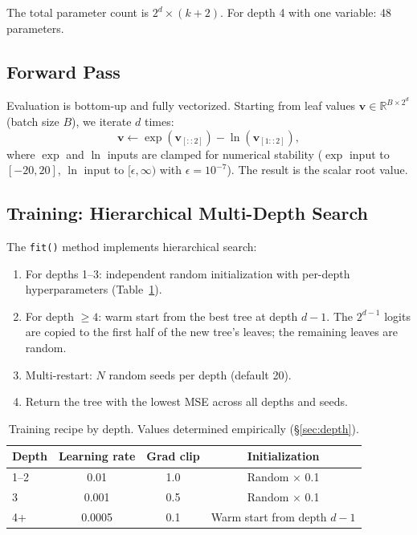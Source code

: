 \documentclass[11pt,a4paper]{article}
\begin{document}
The total parameter count is $2^d \times (k+2)$.
For depth 4 with one variable: 48 parameters.



\subsection{Forward Pass}

Evaluation is bottom-up and fully vectorized.
Starting from leaf values $\mathbf{v} \in \mathbb{R}^{B \times 2^d}$ (batch size $B$), we iterate $d$ times:
\begin{equation}
    \mathbf{v} \leftarrow \exp(\mathbf{v}_{[::2]}) - \ln(\mathbf{v}_{[1::2]}),
\end{equation}
where $\exp$ and $\ln$ inputs are clamped for numerical stability ($\exp$ input to $[-20, 20]$, $\ln$ input to $[\epsilon, \infty)$ with $\epsilon = 10^{-7}$).
The result is the scalar root value.

\subsection{Training: Hierarchical Multi-Depth Search}
\label{sec:training}

The \texttt{fit()} method implements hierarchical search:

\begin{enumerate}
    \item For depths 1--3: independent random initialization with per-depth hyperparameters (Table~\ref{tab:recipe}).
    \item For depth $\geq 4$: warm start from the best tree at depth $d-1$. The $2^{d-1}$ logits are copied to the first half of the new tree's leaves; the remaining leaves are random.
    \item Multi-restart: $N$ random seeds per depth (default 20).
    \item Return the tree with the lowest MSE across all depths and seeds.
\end{enumerate}

\begin{table}[ht]
\centering
\caption{Training recipe by depth. Values determined empirically (\S\ref{sec:depth}).}
\label{tab:recipe}
\begin{tabular}{lccc}
\toprule
Depth & Learning rate & Grad clip & Initialization \\
\midrule
1--2 & 0.01 & 1.0 & Random $\times$ 0.1 \\
3 & 0.001 & 0.5 & Random $\times$ 0.1 \\
4+ & 0.0005 & 0.1 & Warm start from depth $d{-}1$ \\
\bottomrule
\end{tabular}
\end{table}
\end{document}
